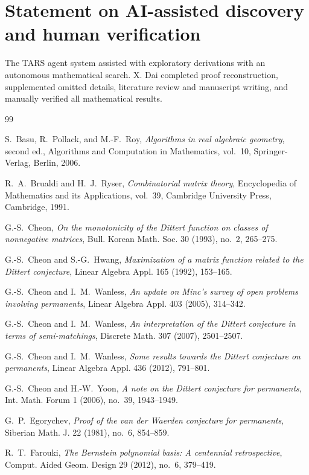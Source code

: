 \documentclass[10pt,a4paper]{amsart}
\theoremstyle{definition}
\theoremstyle{remark}
\begin{document}
\section*{Statement on AI-assisted discovery and human verification}
The TARS agent system assisted with exploratory derivations with an autonomous mathematical search. X. Dai completed proof reconstruction, supplemented omitted details, literature review and manuscript writing, and manually verified all mathematical results.

\begin{thebibliography}{99}
\raggedright

S.~Basu, R.~Pollack, and M.-F.~Roy,
\emph{Algorithms in real algebraic geometry}, second ed.,
Algorithms and Computation in Mathematics, vol.~10,
Springer-Verlag, Berlin, 2006.

R.~A.~Brualdi and H.~J.~Ryser,
\emph{Combinatorial matrix theory},
Encyclopedia of Mathematics and its Applications, vol.~39,
Cambridge University Press, Cambridge, 1991.

G.-S.~Cheon,
\emph{On the monotonicity of the Dittert function on classes of
nonnegative matrices},
Bull. Korean Math. Soc. 30 (1993), no.~2, 265--275.

G.-S.~Cheon and S.-G.~Hwang,
\emph{Maximization of a matrix function related to the Dittert conjecture},
Linear Algebra Appl. 165 (1992), 153--165.

G.-S.~Cheon and I.~M.~Wanless,
\emph{An update on Minc's survey of open problems involving permanents},
Linear Algebra Appl. 403 (2005), 314--342.

G.-S.~Cheon and I.~M.~Wanless,
\emph{An interpretation of the Dittert conjecture in terms of
semi-matchings},
Discrete Math. 307 (2007), 2501--2507.

G.-S.~Cheon and I.~M.~Wanless,
\emph{Some results towards the Dittert conjecture on permanents},
Linear Algebra Appl. 436 (2012), 791--801.

G.-S.~Cheon and H.-W.~Yoon,
\emph{A note on the Dittert conjecture for permanents},
Int. Math. Forum 1 (2006), no.~39, 1943--1949.

G.~P.~Egorychev,
\emph{Proof of the van der Waerden conjecture for permanents},
Siberian Math. J. 22 (1981), no.~6, 854--859.

R.~T.~Farouki,
\emph{The Bernstein polynomial basis: A centennial retrospective},
Comput. Aided Geom. Design 29 (2012), no.~6, 379--419.


\end{thebibliography}
\end{document}
